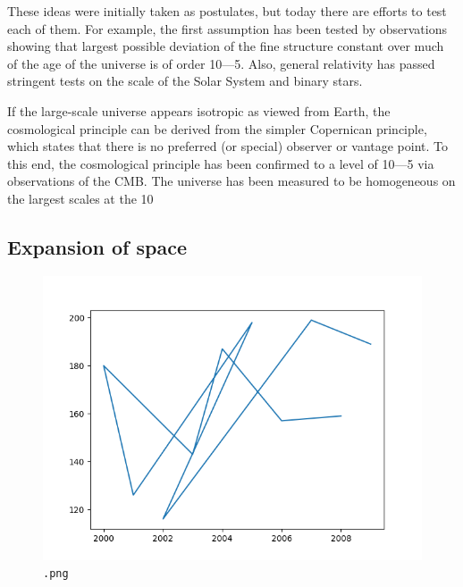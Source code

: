 \documentclass[14pt, oneside]{book}
\begin{document}
		These ideas were initially taken as postulates, but today there are efforts to test each of them. For example, the first assumption has been tested by observations showing that largest possible deviation of the fine structure constant over much of the age of the universe is of order 10---5. Also, general relativity has passed stringent tests on the scale of the Solar System and binary stars.

		If the large-scale universe appears isotropic as viewed from Earth, the cosmological principle can be derived from the simpler Copernican principle, which states that there is no preferred (or special) observer or vantage point. To this end, the cosmological principle has been confirmed to a level of 10---5 via observations of the CMB. The universe has been measured to be homogeneous on the largest scales at the 10%

		\subsection{Expansion of space}
			\begin{figure}
				\includegraphics[width=\linewidth]{images/plot1.png}
				\caption{\texttt{.png}}
				\label{wrapfig:fig1}
			\end{figure}
\end{document}
